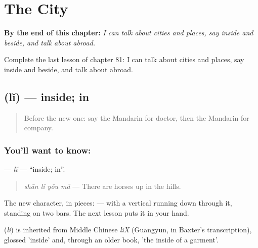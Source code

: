 
\chapter{The City}
\label{ch:zh-the-city}

\begin{chapteropening}
\textbf{By the end of this chapter:} \emph{I can talk about cities and places, say inside and beside, and talk about abroad.}

Complete the last lesson of chapter 81: I can talk about cities and places, say inside and beside, and talk about abroad.
\end{chapteropening}

\section[\texorpdfstring{\zh{里} (lǐ)}{里 (lǐ)}]{ (lǐ) — inside; in}

\label{lesson:ZH-C81-li}



\begin{quote}
Before the new one: say the Mandarin for doctor, then the Mandarin for company.
\end{quote}

\subsection*{You'll want to know: }
\textbf{} — \emph{lǐ} — \textquotedblleft{}inside; in\textquotedblright{}.

\begin{quote}
\textbf{} \emph{shān lǐ yǒu mǎ} — There are horses up in the hills.
\end{quote}

The new character, in pieces:  —  with a vertical running down through it, standing on two bars. The next lesson puts it in your hand.

\begin{cousinweb}
\textbf{} (\emph{lǐ}) is inherited from Middle Chinese \emph{liX} (Guangyun, in Baxter's transcription), glossed 'inside' and, through an older book, 'the inside of a garment'.
\end{cousinweb}

